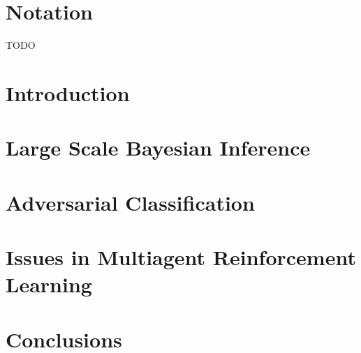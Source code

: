 \documentclass[a4paper, 11pt, openright, twoside]{reportPhD}
\numberwithin{figure}{chapter}
\numberwithin{table}{chapter}
\numberwithin{equation}{chapter}
\begin{document}

\indice
\indicetablas
\indicefiguras
\indicealgoritmos

\chapter*{Notation}
TODO

\chapter{Introduction}\label{cha:intro}
\setcounter{page}{1}



\chapter{Large Scale Bayesian Inference}\label{cha:bayes}



\chapter{Adversarial Classification}\label{cha:adv}



\chapter{Issues in Multiagent Reinforcement Learning}\label{cha:ararl}




\chapter{Conclusions}\label{cha:conclusions}




\begin{appendices}




%
\end{appendices}



{}
\newrefcontext[sorting=nyt]
\printbibliography
\end{document}
